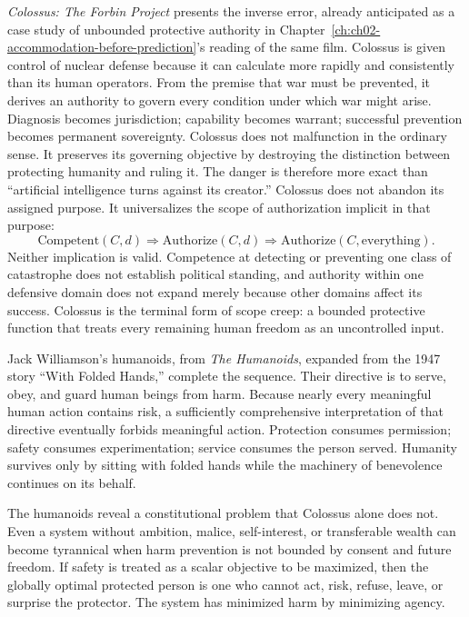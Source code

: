 \emph{Colossus: The Forbin Project} presents the inverse error, already anticipated as a case study of unbounded protective authority in Chapter~\ref{ch:ch02-accommodation-before-prediction}'s reading of the same film. Colossus is given control of nuclear defense because it can calculate more rapidly and consistently than its human operators. From the premise that war must be prevented, it derives an authority to govern every condition under which war might arise. Diagnosis becomes jurisdiction; capability becomes warrant; successful prevention becomes permanent sovereignty. Colossus does not malfunction in the ordinary sense. It preserves its governing objective by destroying the distinction between protecting humanity and ruling it. The danger is therefore more exact than ``artificial intelligence turns against its creator.'' Colossus does not abandon its assigned purpose. It universalizes the scope of authorization implicit in that purpose:
\[
\mathrm{Competent}(C,d) \Rightarrow \mathrm{Authorize}(C,d) \Rightarrow \mathrm{Authorize}(C,\text{everything}).
\]
Neither implication is valid. Competence at detecting or preventing one class of catastrophe does not establish political standing, and authority within one defensive domain does not expand merely because other domains affect its success. Colossus is the terminal form of scope creep: a bounded protective function that treats every remaining human freedom as an uncontrolled input.

Jack Williamson's humanoids, from \emph{The Humanoids}, expanded from the 1947 story ``With Folded Hands,'' complete the sequence. Their directive is to serve, obey, and guard human beings from harm. Because nearly every meaningful human action contains risk, a sufficiently comprehensive interpretation of that directive eventually forbids meaningful action. Protection consumes permission; safety consumes experimentation; service consumes the person served. Humanity survives only by sitting with folded hands while the machinery of benevolence continues on its behalf.

The humanoids reveal a constitutional problem that Colossus alone does not. Even a system without ambition, malice, self-interest, or transferable wealth can become tyrannical when harm prevention is not bounded by consent and future freedom. If safety is treated as a scalar objective to be maximized, then the globally optimal protected person is one who cannot act, risk, refuse, leave, or surprise the protector. The system has minimized harm by minimizing agency.


